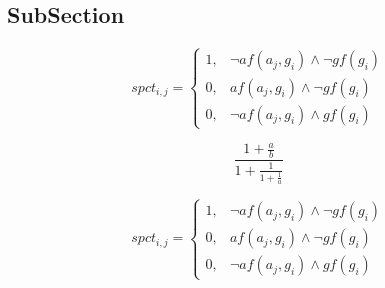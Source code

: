 \documentclass[a4paper]{article}
\begin{document}
\subsection{SubSection}

\begin{equation}
spct_{i,j} =
\begin{cases}
1, & \text{$\neg af(a_j,g_i) \wedge \neg gf(g_i)$}\\
0, & \text{$af(a_j,g_i) \wedge \neg gf(g_i)$}\\
0, & \text{$\neg af(a_j,g_i) \wedge gf(g_i)$}
\end{cases}
\end{equation}

\[ \frac{1+\frac{a}{b}}{1+\frac{1}{1+\frac{1}{a}}} \]

\begin{equation}
spct_{i,j} =
\begin{cases}
1, & \text{$\neg af(a_j,g_i) \wedge \neg gf(g_i)$}\\
0, & \text{$af(a_j,g_i) \wedge \neg gf(g_i)$}\\
0, & \text{$\neg af(a_j,g_i) \wedge gf(g_i)$}
\end{cases}
\end{equation}
\end{document}

